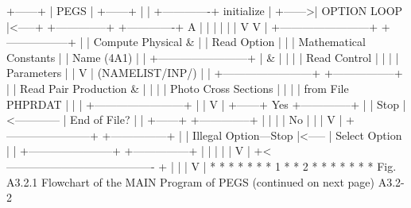 \newpage
{}
\begin{center}
\begin{boxedverbatim}
                          +------+
                          | PEGS |
                          +------+
                            |  |       +-------------+
                initialize  |  +------>| OPTION LOOP |<-----+
             +--------------+          +-------------+      A
             |                                |             |
             |                                |             |
             V                                V             |
 +------------------------+          +-----------------+    |
 |   Compute Physical &   |          |   Read Option   |    |
 | Mathematical Constants |          |    Name (4A1)   |    |
 +------------------------+          |        &        |    |
             |                       |   Read Control  |    |
             |                       |    Parameters   |    |
             V                       | (NAMELIST/INP/) |    |
 +------------------------+          +-----------------+    |
 | Read Pair Production & |                   |             |
 |  Photo Cross Sections  |                   |             |
 |    from File PHPRDAT   |                   |             |
 +------------------------+                   |             |
                                              V             |
                +------+     Yes      +--------------+      |
                | Stop |<------------ | End of File? |      |
                +------+              +--------------+      |
                                              |             |
                                              | No          |
                                              |             |
                                              V             |
      +-----------------------+       +---------------+     |
      | Illegal Option---Stop |<----- | Select Option |     |
      +-----------------------+       +---------------+     |
                                              |             |
                                              |             |
                                              V             |
   +<---------------------------------------- +             |
   |                                                        |
   V                                                        |
   *                                                        *
  * *                                                      * *
 * 1 *                                                    * 2 *
  * *                                                      * *
   *                                                        *
      Fig. A3.2.1  Flowchart of the MAIN Program of PEGS
                        (continued on next page)
 A3.2-2
\end{boxedverbatim}
\end{center}
